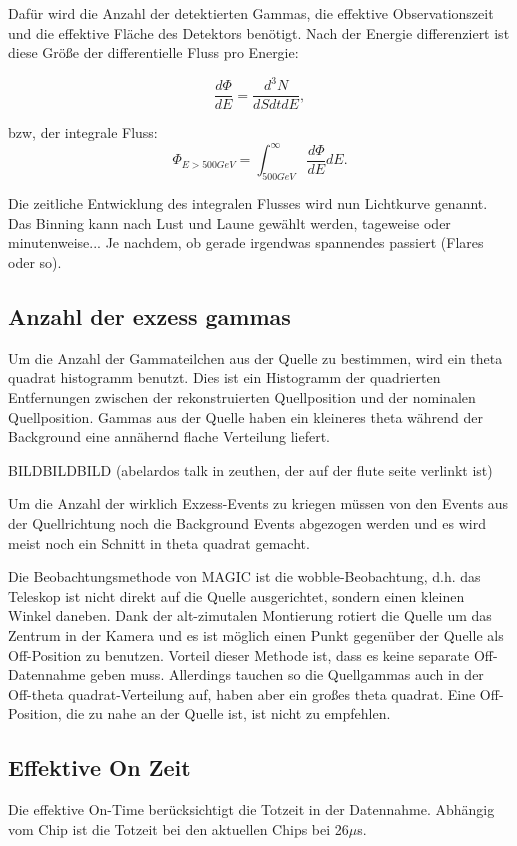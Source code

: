 Dafür wird die Anzahl der detektierten Gammas, die effektive Observationszeit und die effektive Fläche des Detektors benötigt.
Nach der Energie differenziert ist diese Größe der differentielle Fluss pro Energie:

\begin{equation}
 \frac{d\Phi}{dE}=\frac{d^3N}{dSdtdE},
\end{equation}

bzw, der integrale Fluss:
\begin{equation}
 \Phi_{E>500GeV}=\int_{500GeV}^{\infty}\frac{d\Phi}{dE}dE.
\end{equation}


Die zeitliche Entwicklung des integralen Flusses wird nun Lichtkurve genannt.
Das Binning kann nach Lust und Laune gewählt werden, tageweise oder minutenweise... Je nachdem, ob gerade irgendwas spannendes passiert (Flares oder so).

\subsection{Anzahl der exzess gammas}
Um die Anzahl der Gammateilchen aus der Quelle zu bestimmen, wird ein theta quadrat histogramm benutzt.
Dies ist ein Histogramm der quadrierten Entfernungen zwischen der rekonstruierten Quellposition und der nominalen Quellposition.
Gammas aus der Quelle haben ein kleineres theta während der Background eine annähernd flache Verteilung liefert. 

BILDBILDBILD (abelardos talk in zeuthen, der auf der flute seite verlinkt ist)

Um die Anzahl der wirklich Exzess-Events zu kriegen müssen von den Events aus der Quellrichtung noch die Background Events abgezogen werden und es wird meist noch ein Schnitt in theta quadrat gemacht.

Die Beobachtungsmethode von MAGIC ist die wobble-Beobachtung, d.h. das Teleskop ist nicht direkt auf die Quelle ausgerichtet, sondern einen kleinen Winkel daneben.
Dank der alt-zimutalen Montierung rotiert die Quelle um das Zentrum in der Kamera und es ist möglich einen Punkt gegenüber der Quelle als Off-Position zu benutzen.
Vorteil dieser Methode ist, dass es keine separate Off-Datennahme geben muss.
Allerdings tauchen so die Quellgammas auch in der Off-theta quadrat-Verteilung auf, haben aber ein großes theta quadrat.
Eine Off-Position, die zu nahe an der Quelle ist, ist nicht zu empfehlen.

\subsection{Effektive On Zeit}
Die effektive On-Time berücksichtigt die Totzeit in der Datennahme.
Abhängig vom Chip ist die Totzeit bei den aktuellen Chips bei 26$\mu$s.


